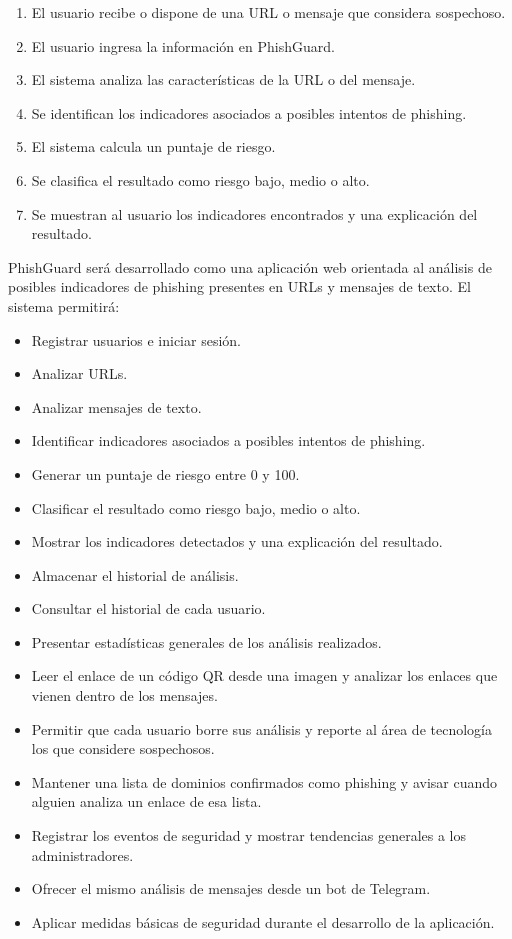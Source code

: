 \documentclass[journal,onecolumn,12pt,draftclsnofoot]{IEEEtran}
\begin{document}
\begin{enumerate}
  \item El usuario recibe o dispone de una URL o mensaje que considera sospechoso.
  \item El usuario ingresa la información en PhishGuard.
  \item El sistema analiza las características de la URL o del mensaje.
  \item Se identifican los indicadores asociados a posibles intentos de phishing.
  \item El sistema calcula un puntaje de riesgo.
  \item Se clasifica el resultado como riesgo bajo, medio o alto.
  \item Se muestran al usuario los indicadores encontrados y una explicación del resultado.
\end{enumerate}

PhishGuard será desarrollado como una aplicación web orientada al análisis de posibles indicadores de phishing presentes en URLs y mensajes de texto. El sistema permitirá:

\begin{itemize}
  \item Registrar usuarios e iniciar sesión.
  \item Analizar URLs.
  \item Analizar mensajes de texto.
  \item Identificar indicadores asociados a posibles intentos de phishing.
  \item Generar un puntaje de riesgo entre 0 y 100.
  \item Clasificar el resultado como riesgo bajo, medio o alto.
  \item Mostrar los indicadores detectados y una explicación del resultado.
  \item Almacenar el historial de análisis.
  \item Consultar el historial de cada usuario.
  \item Presentar estadísticas generales de los análisis realizados.
  \item Leer el enlace de un código QR desde una imagen y analizar los enlaces que vienen dentro de los mensajes.
  \item Permitir que cada usuario borre sus análisis y reporte al área de tecnología los que considere sospechosos.
  \item Mantener una lista de dominios confirmados como phishing y avisar cuando alguien analiza un enlace de esa lista.
  \item Registrar los eventos de seguridad y mostrar tendencias generales a los administradores.
  \item Ofrecer el mismo análisis de mensajes desde un bot de Telegram.
  \item Aplicar medidas básicas de seguridad durante el desarrollo de la aplicación.
\end{itemize}
\end{document}
